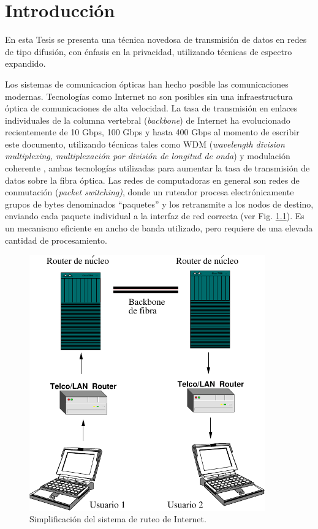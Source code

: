\chapter{Introducción}

En esta Tesis se presenta una técnica novedosa de transmisión de datos en redes de tipo difusión, con énfasis en la privacidad, utilizando técnicas de espectro expandido.

Los sistemas de comunicacion ópticas han hecho posible las comunicaciones modernas. Tecnologías como Internet no son posibles sin una infraestructura óptica de comunicaciones de alta velocidad. 
La tasa de transmisión en enlaces individuales de la columna vertebral (\textit{backbone}) de Internet ha evolucionado recientemente de 10 Gbps, 100 Gbps y hasta 400 Gbps \cite{backbone} al momento de escribir este documento, utilizando técnicas tales como WDM (\textit{wavelength division multiplexing, multiplexación por división de longitud de onda}) y modulación coherente \cite{shieh2008coherent}, ambas tecnologías utilizadas para aumentar la tasa de transmisión de datos sobre la fibra óptica. 
Las redes de computadoras en general son redes de conmutación (\textit{packet switching)}, donde un ruteador procesa electrónicamente grupos de bytes denominados ``paquetes'' y los retransmite a los nodos de destino, enviando cada paquete individual a la interfaz de red correcta (ver Fig. \ref{arch:simp}). Es un mecanismo eficiente en ancho de banda utilizado, pero requiere de una elevada cantidad de procesamiento.

\begin{figure}[!t]
  \centering
    \includegraphics[width=4.0in]{graphs/internet.pdf}
    \caption{Simplificación del sistema de ruteo de Internet.}
    \label{arch:simp}
\end{figure}



